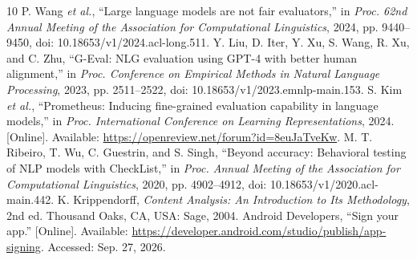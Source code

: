 \documentclass[conference]{IEEEtran}
\begin{document}
\begin{thebibliography}{10}
 P. Wang \emph{et al.}, ``Large language models are not fair evaluators,'' in \emph{Proc. 62nd Annual Meeting of the Association for Computational Linguistics}, 2024, pp. 9440--9450, doi: 10.18653/v1/2024.acl-long.511.
 Y. Liu, D. Iter, Y. Xu, S. Wang, R. Xu, and C. Zhu, ``G-Eval: NLG evaluation using GPT-4 with better human alignment,'' in \emph{Proc. Conference on Empirical Methods in Natural Language Processing}, 2023, pp. 2511--2522, doi: 10.18653/v1/2023.emnlp-main.153.
 S. Kim \emph{et al.}, ``Prometheus: Inducing fine-grained evaluation capability in language models,'' in \emph{Proc. International Conference on Learning Representations}, 2024. [Online]. Available: \url{https://openreview.net/forum?id=8euJaTveKw}.
 M. T. Ribeiro, T. Wu, C. Guestrin, and S. Singh, ``Beyond accuracy: Behavioral testing of NLP models with CheckList,'' in \emph{Proc. Annual Meeting of the Association for Computational Linguistics}, 2020, pp. 4902--4912, doi: 10.18653/v1/2020.acl-main.442.
 K. Krippendorff, \emph{Content Analysis: An Introduction to Its Methodology}, 2nd ed. Thousand Oaks, CA, USA: Sage, 2004.
 Android Developers, ``Sign your app.'' [Online]. Available: \url{https://developer.android.com/studio/publish/app-signing}. Accessed: Sep. 27, 2026.
\end{thebibliography}
\end{document}
